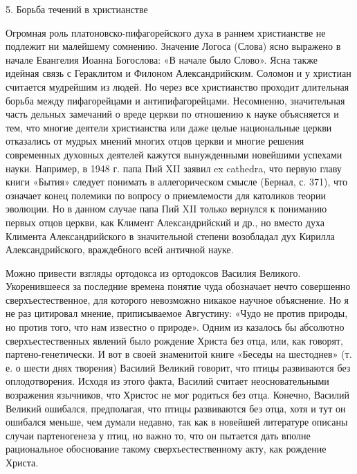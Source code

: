 5. Борьба течений в христианстве

Огромная роль платоновско-пифагорейского духа в раннем христианстве не
подлежит ни малейшему сомнению.  Значение Логоса (Слова) ясно выражено
в начале Евангелия Иоанна Богослова: «В начале было Слово». Ясна также
идейная  связь с  Гераклитом и  Филоном Александрийским.  Соломон и  у
христиан  считается  мудрейшим из  людей.  Но  через все  христианство
проходит  длительная борьба  между пифагорейцами  и антипифагорейцами.
Несомненно,  значительная часть  дельных замечаний  о вреде  церкви по
отношению к науке  объясняется и тем, что  многие деятели христианства
или  даже  целые  национальные  церкви  отказались  от  мудрых  мнений
многих  отцов церкви  и многие  решения современных  духовных деятелей
кажутся  вынужденными новейшими  успехами науки.  Например, в  1948 г.
папа  Пий XII  заявил  ex  cathedra, что  первую  главу книги  «Бытия»
следует  понимать  в  аллегорическом  смысле  (Бернал,  с.  371),  что
означает конец полемики по вопросу о приемлемости для католиков теории
эволюции. Но в данном случае папа  Пий XII только вернулся к пониманию
первых  отцов церкви,  как Климент  Александрийский и  др., но  вместо
духа Климента  Александрийского в значительной степени  возобладал дух
Кирилла Александрийского, враждебного всей античной науке.

Можно  привести  взгляды  ортодокса из  ортодоксов  Василия  Великого.
Укоренившееся  за  последние  времена понятие  чуда  обозначает  нечто
совершенно сверхъестественное, для которого невозможно никакое научное
объяснение.  Но я  не раз  цитировал мнение,  приписываемое Августину:
«Чудо не против природы, но против  того, что нам известно о природе».
Одним  из  казалось  бы   абсолютно  сверхъестественных  явлений  было
рождение  Христа  без  отца, или,  как  говорят,  партено-генетически.
И  вот  в своей  знаменитой  книге  «Беседы  на  шестоднев» (т.  е.  о
шести днях  творения) Василий  Великий говорит, что  птицы развиваются
без   оплодотворения.  Исходя   из   этого   факта,  Василий   считает
неосновательными возражения язычников, что Христос не мог родиться без
отца.  Конечно,  Василий  Великий  ошибался,  предполагая,  что  птицы
развиваются  без отца,  хотя  и  тут он  ошибался  меньше, чем  думали
недавно, так  как в  новейшей литературе описаны  случаи партеногенеза
у  птиц,  но  важно  то,  что он  пытается  дать  вполне  рациональное
обоснование такому сверхъестественному акту, как рождение Христа.

